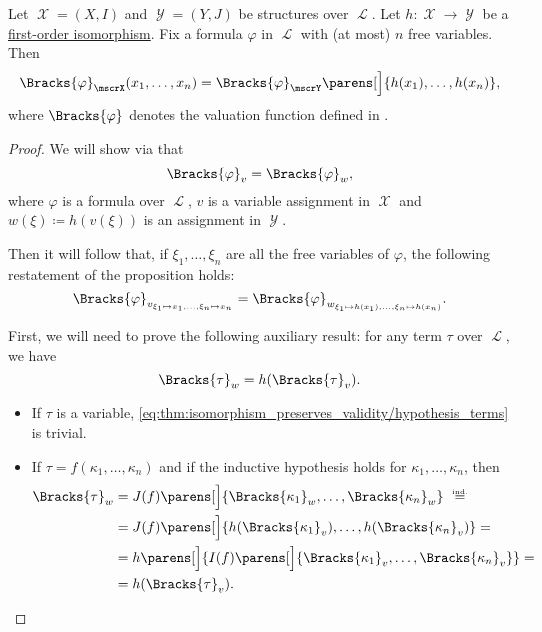 \begin{proposition}\label{thm:isomorphism_preserves_validity}
  Let \( \mscrX = (X, I) \) and \( \mscrY = (Y, J) \) be structures over \( \mscrL \). Let \( h: \mscrX \to \mscrY \) be a \hyperref[def:first_order_isomorphism]{first-order isomorphism}. Fix a formula \( \varphi \) in \( \mscrL \) with (at most) \( n \) free variables. Then
  \begin{equation*}
    \Bracks{\varphi}_\mscrX(x_1, \ldots, x_n) = \Bracks{\varphi}_\mscrY\parens[\Big]{ h(x_1), \ldots, h(x_n) },
  \end{equation*}
  where \( \Bracks{\varphi} \) denotes the valuation function defined in .
\end{proposition}
\begin{proof}
  We will show via  that
  \begin{equation}\label{eq:thm:isomorphism_preserves_validity/hypothesis_formulas}
    \Bracks{\varphi}_v = \Bracks{\varphi}_w,
  \end{equation}
  where \( \varphi \) is a formula over \( \mscrL \), \( v \) is a variable assignment in \( \mscrX \) and \( w(\xi) \coloneqq h(v(\xi)) \) is an assignment in \( \mscrY \).

  Then it will follow that, if \( \xi_1, \ldots, \xi_n \) are all the free variables of \( \varphi \), the following restatement of the proposition holds:
  \begin{equation*}
    \Bracks{\varphi}_{v_{\xi_1 \mapsto x_1, \ldots, \xi_n \mapsto x_n}}
    =
    \Bracks{\varphi}_{w_{\xi_1 \mapsto h(x_1), \ldots, \xi_n \mapsto h(x_n)}}.
  \end{equation*}

  First, we will need to prove the following auxiliary result: for any term \( \tau \) over \( \mscrL \), we have
  \begin{equation}\label{eq:thm:isomorphism_preserves_validity/hypothesis_terms}
    \Bracks{\tau}_w = h(\Bracks{\tau}_v).
  \end{equation}

  \begin{itemize}
    \item If \( \tau \) is a variable, \eqref{eq:thm:isomorphism_preserves_validity/hypothesis_terms} is trivial.
    \item If \( \tau = f(\kappa_1, \ldots, \kappa_n) \) and if the inductive hypothesis holds for \( \kappa_1, \ldots, \kappa_n \), then
    \begin{align*}
      \Bracks{\tau}_w
      &=
      J(f)\parens[\Big]{ \Bracks{\kappa_1}_w, \ldots, \Bracks{\kappa_n}_w }
      \reloset {\T{ind.}} = \\ &=
      J(f)\parens[\Big]{ h(\Bracks{\kappa_1}_v), \ldots, h(\Bracks{\kappa_n}_v) }
      = \\ &=
      h\parens[\Big]{ I(f)\parens[\Big]{ \Bracks{\kappa_1}_v, \ldots, \Bracks{\kappa_n}_v } }
      = \\ &=
      h(\Bracks{\tau}_v).
    \end{align*}
  \end{itemize}


\end{proof}
